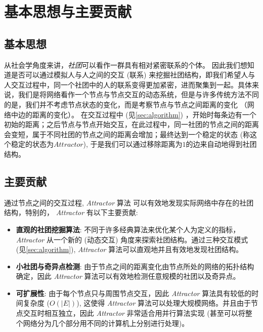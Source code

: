 \section{基本思想与主要贡献}
\label{sec:basicidea}
\subsection{基本思想}
从社会学角度来讲，\emph{社团}可以看作一群具有相对紧密联系的个体。 因此我们想知道是否可以通过模拟人与人之间的交互 (联系) 来挖掘社团结构，即我们希望人与人交互过程中，同一个社团中的人的联系变得更加紧密，进而聚集到一起。具体来说，我们是将网络看作一个节点与节点交互的动态系统，但是与许多传统方法不同的是，我们并不考虑节点状态的变化，而是考察节点与节点之间距离的变化 （网络中边的距离的变化）。 在交互过程中 (见\ref{sec:algorithm}) ，开始时每条边有一个初始的距离；之后节点与节点开始交互，在此过程中，同一社团的节点之间的距离会变短，属于不同社团的节点之间的距离会增加；最终达到一个稳定的状态 (称这个稳定的状态为$Attractor$), 于是我们可以通过移除距离为$1$的边来自动地得到社团结构。 

\subsection{主要贡献}
通过节点之间的交互过程, \emph{Attractor} 算法 可以有效地发现实际网络中存在的社团结构，特别的， \emph{Attractor} 有以下主要贡献:
\begin{itemize}
\item \textbf{直观的社团挖掘算法}: 不同于许多经典算法来优化某个人为定义的指标， \emph{Attractor} 从一个新的 (动态交互) 角度来探索社团结构。通过三种交互模式 (见\ref{sec:algorithm}), \emph{Attractor} 算法可以直观地并且有效地发现社团结构。 
\item \textbf{小社团与奇异点检测}: 由于节点之间的距离变化由节点所处的网络的拓扑结构确定，因此 \emph{Attractor} 算法可以有效地检测任意规模的社团以及奇异点。
\item \textbf{可扩展性}: 由于每个节点只与周围节点交互，因此 \emph{Attractor} 算法具有较低的时间复杂度 ($O(|E|)$), 这使得 \emph{Attractor} 算法可以处理大规模网络。并且由于节点交互时相互独立，因此 \emph{Attractor} 非常适合用并行算法实现 (甚至可以将整个网络分为几个部分用不同的计算机上分别进行处理)。
\end{itemize}


